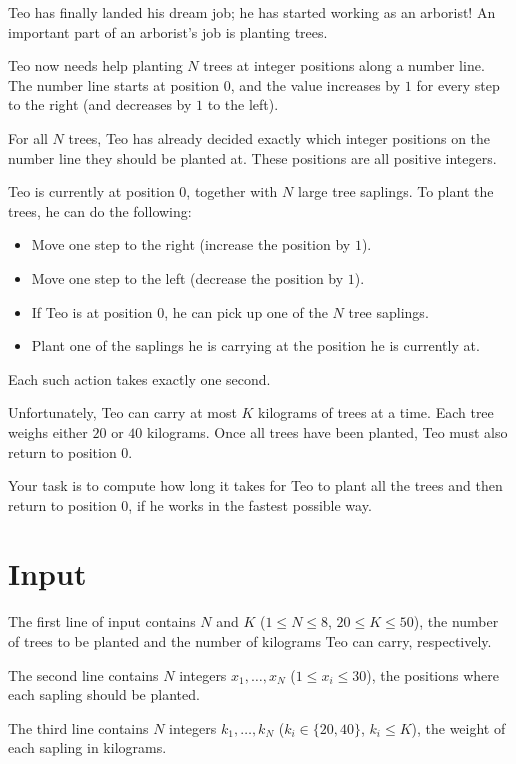 
Teo has finally landed his dream job; he has started working as an arborist!
An important part of an arborist's job is planting trees.

Teo now needs help planting $N$ trees at integer positions along a number line.
The number line starts at position $0$, and the value increases by $1$ for every step to the right (and decreases by $1$ to the left).

For all $N$ trees, Teo has already decided exactly which integer positions on the number line they should be planted at.
These positions are all positive integers.

Teo is currently at position $0$, together with $N$ large tree saplings.
To plant the trees, he can do the following:
\begin{itemize}
  \item Move one step to the right (increase the position by $1$).
  \item Move one step to the left (decrease the position by $1$).
  \item If Teo is at position $0$, he can pick up one of the $N$ tree saplings.
  \item Plant one of the saplings he is carrying at the position he is currently at.
\end{itemize}
Each such action takes exactly one second.

Unfortunately, Teo can carry at most $K$ kilograms of trees at a time.
Each tree weighs either $20$ or $40$ kilograms.
Once all trees have been planted, Teo must also return to position $0$.

Your task is to compute how long it takes for Teo to plant all the trees and then return to position $0$, if he works in the fastest possible way.

\section*{Input}
The first line of input contains $N$ and $K$ ($1 \leq N \leq 8$, $20 \leq K \leq 50$),
the number of trees to be planted and the number of kilograms Teo can carry, respectively.

The second line contains $N$ integers $x_1, \dots, x_N$ ($1 \leq x_i \leq 30$), the positions
where each sapling should be planted.

The third line contains $N$ integers $k_1, \dots, k_N$ ($k_i \in \{20, 40\}$, $k_i \leq K$),
the weight of each sapling in kilograms.

